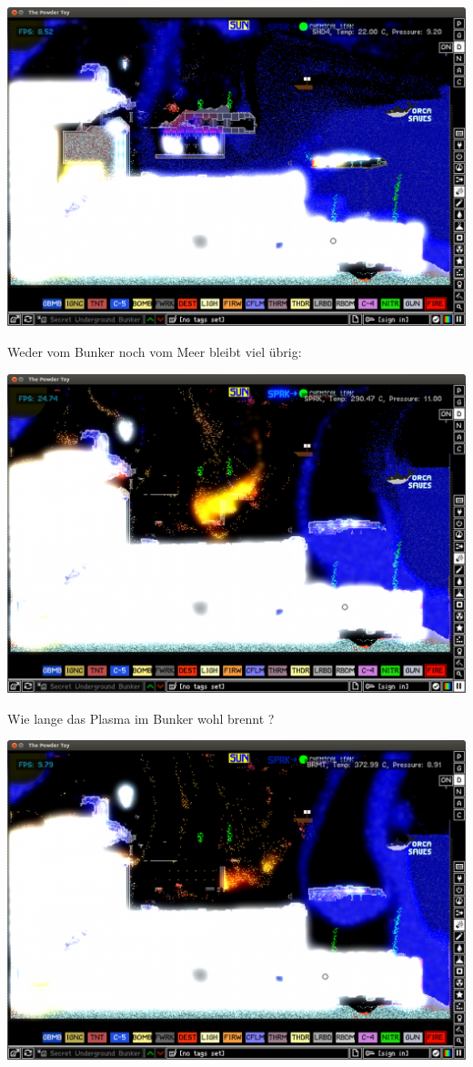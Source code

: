 \begin{multicols}{2}
\begin{center}
\includegraphics[width=\linewidth]{powdertoy/powdertoy-bu13.png}
\end{center}
Weder vom Bunker noch vom Meer bleibt viel übrig:
\begin{center}
\includegraphics[width=\linewidth]{powdertoy/powdertoy-bu14.png}
\end{center}
Wie lange das Plasma im Bunker wohl brennt ?
\begin{center}
\includegraphics[width=\linewidth]{powdertoy/powdertoy-bu15.png}

\end{center}
\end{multicols}
